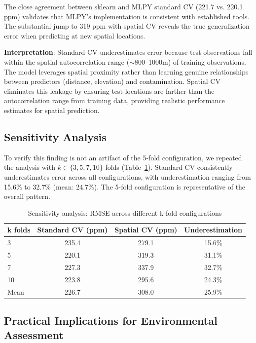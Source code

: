 \documentclass[review,12pt]{elsarticle}
\begin{document}
The close agreement between sklearn and MLPY standard CV (221.7 vs. 220.1 ppm) validates that MLPY's implementation is consistent with established tools. The substantial jump to 319 ppm with spatial CV reveals the true generalization error when predicting at new spatial locations.

\textbf{Interpretation}: Standard CV underestimates error because test observations fall within the spatial autocorrelation range ($\sim$800--1000m) of training observations. The model leverages spatial proximity rather than learning genuine relationships between predictors (distance, elevation) and contamination. Spatial CV eliminates this leakage by ensuring test locations are farther than the autocorrelation range from training data, providing realistic performance estimates for spatial prediction.

\subsection{Sensitivity Analysis}

To verify this finding is not an artifact of the 5-fold configuration, we repeated the analysis with $k \in \{3, 5, 7, 10\}$ folds (Table~\ref{tab:sensitivity}). Standard CV consistently underestimates error across all configurations, with underestimation ranging from 15.6\% to 32.7\% (mean: 24.7\%). The 5-fold configuration is representative of the overall pattern.

\begin{table}[ht]
\centering
\caption{Sensitivity analysis: RMSE across different k-fold configurations}
\label{tab:sensitivity}
\begin{tabular}{lccc}
\toprule
k folds & Standard CV (ppm) & Spatial CV (ppm) & Underestimation \\
\midrule
3 & 235.4 & 279.1 & 15.6\% \\
5 & 220.1 & 319.3 & 31.1\% \\
7 & 227.3 & 337.9 & 32.7\% \\
10 & 223.8 & 295.6 & 24.3\% \\
\midrule
Mean & 226.7 & 308.0 & 25.9\% \\
\bottomrule
\end{tabular}
\end{table}

\subsection{Practical Implications for Environmental Assessment}
\end{document}
